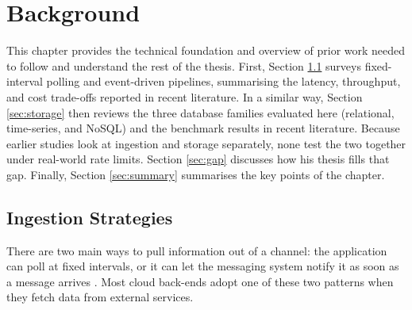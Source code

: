 \documentclass[nomenclature, english, biblatex]{kththesis}
\numberwithin{listing}{chapter}
\begin{document}
\cleardoublepage
\chapter{Background}
\label{ch:background}

This chapter provides the technical foundation and overview of prior work needed to follow and understand the rest of the thesis. First, 
Section \ref{sec:ingestion} surveys fixed-interval polling and event-driven pipelines, summarising the latency, throughput, and cost trade-offs reported in recent literature. In a similar way, Section \ref{sec:storage} then reviews the three database families evaluated here (relational, time-series, and NoSQL) and the benchmark results in recent literature. Because earlier studies look at ingestion and storage separately, none test the two together under real-world rate limits. Section \ref{sec:gap} discusses how his thesis fills that gap. Finally, Section \ref{sec:summary} summarises the key points of the chapter.


%

\section{Ingestion Strategies}
\label{sec:ingestion}
There are two main ways to pull information out of a channel: the application can poll at fixed intervals, or it can let the messaging system notify it as soon as a message arrives \cite[Ch.~10]{Hohpe2003EIP}.
Most cloud back-ends adopt one of these two patterns when they fetch data from external services.
\end{document}
